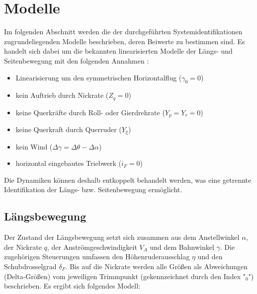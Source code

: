 \chapter{Modelle}

Im folgenden Abschnitt werden die der durchgeführten Systemidentifikationen zugrundeliegenden Modelle beschrieben, deren 
Beiwerte zu bestimmen sind. Es handelt sich dabei um die bekannten linearisierten Modelle der Längs- und Seitenbewegung mit 
den folgenden Annahmen \cite{Fichter2009}:
\begin{itemize}
	\item Linearisierung um den symmetrischen Horizontalflug ($ \gamma_0=0 $)
	\item kein Auftrieb durch Nickrate ($ Z_q=0 $)
	\item keine Querkräfte durch Roll- oder Gierdrehrate ($ Y_p=Y_r=0 $)
	\item keine Querkraft durch Querruder ($ Y_\xi $)
	\item kein Wind ($ \Delta\gamma = \Delta\theta-\Delta\alpha $)
	\item horizontal eingebautes Triebwerk ($ i_F=0 $)
\end{itemize} 
Die Dynamiken können deshalb entkoppelt behandelt werden, was eine getrennte Identifikation der Längs- bzw. Seitenbewegung 
ermöglicht. %

\section{Längsbewegung}
Der Zustand der Längsbewegung setzt sich zusammen aus dem Anstellwinkel $ \alpha $, der Nickrate $ q $, der 
Anströmgeschwindigkeit $ V_A $ und dem Bahnwinkel $ \gamma $. Die zugehörigen Steuerungen umfassen den Höhenruderausschlag $ 
\eta $ und den Schubdrosselgrad $ \delta_F $. Bis auf die Nickrate werden alle Größen als Abweichungen (Delta-Größen) vom 
jeweiligen Trimmpunkt (gekennzeichnet durch den Index "$ _0 $") beschrieben. Es ergibt sich folgendes Modell:

